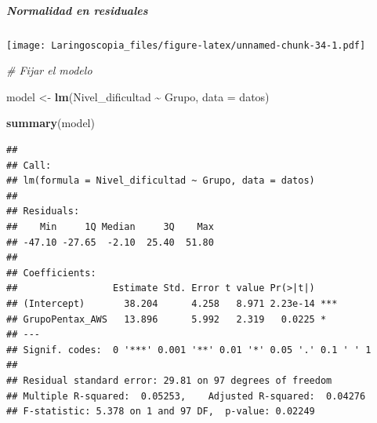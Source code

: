 \documentclass[
]{article}
\newenvironment{Shaded}{\begin{snugshade}}{\end{snugshade}}
\newcommand{\AttributeTok}[1]{\textcolor[rgb]{0.13,0.29,0.53}{#1}}
\newcommand{\CommentTok}[1]{\textcolor[rgb]{0.56,0.35,0.01}{\textit{#1}}}
\newcommand{\FunctionTok}[1]{\textcolor[rgb]{0.13,0.29,0.53}{\textbf{#1}}}
\newcommand{\NormalTok}[1]{#1}
\newcommand{\OtherTok}[1]{\textcolor[rgb]{0.56,0.35,0.01}{#1}}
\newcommand{\SpecialCharTok}[1]{\textcolor[rgb]{0.81,0.36,0.00}{\textbf{#1}}}
\begin{document}
\hypertarget{normalidad-en-residuales}{%
\subparagraph{Normalidad en residuales}\label{normalidad-en-residuales}}

\begin{Shaded}
\end{Shaded}

\texttt{[image: Laringoscopia\_files/figure-latex/unnamed-chunk-34-1.pdf]}

\begin{Shaded}
\begin{Highlighting}[]
\CommentTok{\# Fijar el modelo }

\NormalTok{model }\OtherTok{\textless{}{-}} \FunctionTok{lm}\NormalTok{(Nivel\_dificultad }\SpecialCharTok{\textasciitilde{}}\NormalTok{ Grupo, }\AttributeTok{data =}\NormalTok{ datos)}

\FunctionTok{summary}\NormalTok{(model)}
\end{Highlighting}
\end{Shaded}

\begin{verbatim}
## 
## Call:
## lm(formula = Nivel_dificultad ~ Grupo, data = datos)
## 
## Residuals:
##    Min     1Q Median     3Q    Max 
## -47.10 -27.65  -2.10  25.40  51.80 
## 
## Coefficients:
##                 Estimate Std. Error t value Pr(>|t|)    
## (Intercept)       38.204      4.258   8.971 2.23e-14 ***
## GrupoPentax_AWS   13.896      5.992   2.319   0.0225 *  
## ---
## Signif. codes:  0 '***' 0.001 '**' 0.01 '*' 0.05 '.' 0.1 ' ' 1
## 
## Residual standard error: 29.81 on 97 degrees of freedom
## Multiple R-squared:  0.05253,    Adjusted R-squared:  0.04276 
## F-statistic: 5.378 on 1 and 97 DF,  p-value: 0.02249
\end{verbatim}

\begin{Shaded}
\end{Shaded}
\end{document}
